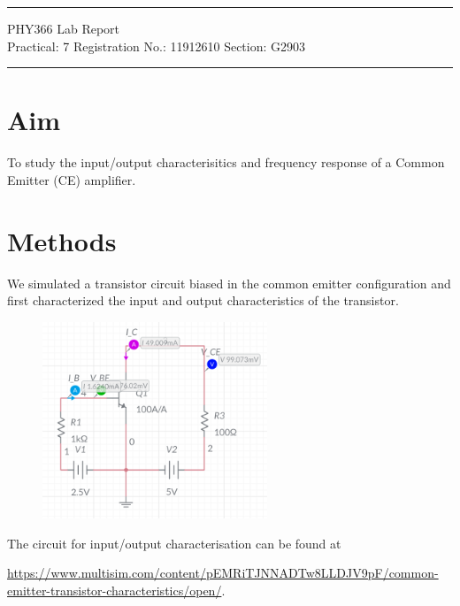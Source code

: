 \documentclass{article}
\begin{document}
	
	\author{Aayush Arya}
	\date{(Submitted: November 1, 2021)}
	\title{}
	
	\maketitle
	
	\hrule
	\begin{center}
		PHY366 Lab Report\\
		Practical: 7 \quad Registration No.: 11912610 \quad Section: G2903
	\end{center}
	\hrule
	
	\section*{Aim}
	To study the input/output characterisitics and frequency response of a Common Emitter (CE) amplifier.
	
	\section*{Methods}
	
	We simulated a transistor circuit biased in the common emitter configuration and first characterized the input and output characteristics of the transistor.
	
	\begin{figure}[!h]
		\centering
		\includegraphics[width=0.6\textwidth]{io_chars}
	\end{figure}
	
	The circuit for input/output characterisation can be found at
	
	 \url{https://www.multisim.com/content/pEMRiTJNNADTw8LLDJV9pF/common-emitter-transistor-characteristics/open/}.
	 
	 
\end{document}
